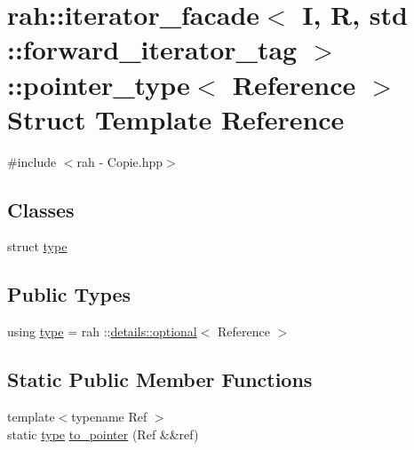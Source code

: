 \hypertarget{structrah_1_1iterator__facade_3_01_i_00_01_r_00_01std_01_1_1forward__iterator__tag_01_4_1_1pointer__type}{}\section{rah\+::iterator\+\_\+facade$<$ I, R, std \+::forward\+\_\+iterator\+\_\+tag $>$\+::pointer\+\_\+type$<$ Reference $>$ Struct Template Reference}
\label{structrah_1_1iterator__facade_3_01_i_00_01_r_00_01std_01_1_1forward__iterator__tag_01_4_1_1pointer__type}


{\ttfamily \#include $<$rah -\/ Copie.\+hpp$>$}

\subsection*{Classes}
\begin{DoxyCompactItemize}
\item 
struct \mbox{\hyperlink{structrah_1_1iterator__facade_3_01_i_00_01_r_00_01std_01_1_1forward__iterator__tag_01_4_1_1pointer__type_1_1type}{type}}
\end{DoxyCompactItemize}
\subsection*{Public Types}
\begin{DoxyCompactItemize}
\item 
using \mbox{\hyperlink{structrah_1_1iterator__facade_3_01_i_00_01_r_00_01std_01_1_1forward__iterator__tag_01_4_1_1pointer__type_a78f5c4b9c79f5e8f6b15eade261ee718}{type}} = rah \+::\mbox{\hyperlink{structrah_1_1details_1_1optional}{details\+::optional}}$<$ Reference $>$
\end{DoxyCompactItemize}
\subsection*{Static Public Member Functions}
\begin{DoxyCompactItemize}
\item 
{\footnotesize template$<$typename Ref $>$ }\\static \mbox{\hyperlink{structrah_1_1iterator__facade_3_01_i_00_01_r_00_01std_01_1_1forward__iterator__tag_01_4_1_1pointer__type_a78f5c4b9c79f5e8f6b15eade261ee718}{type}} \mbox{\hyperlink{structrah_1_1iterator__facade_3_01_i_00_01_r_00_01std_01_1_1forward__iterator__tag_01_4_1_1pointer__type_ab86e0e3057472d1e5f2db25df8e8de49}{to\+\_\+pointer}} (Ref \&\&ref)
\end{DoxyCompactItemize}


